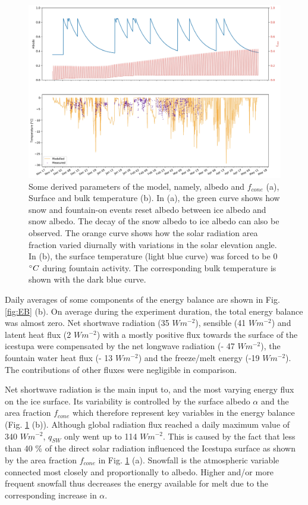 \documentclass[utf8]{frontiersSCNS} %
\begin{document}
\begin{figure} 
    \centering
    \includegraphics[width=15 cm]{Figures/albedo_temperature.jpg} 
\caption{Some derived parameters of the model, namely, albedo and $f_{cone}$ (a), Surface and bulk temperature (b). In
    (a), the green curve shows how snow and fountain-on events reset albedo between ice albedo and snow albedo.  The
    decay of the snow albedo to ice albedo can also be observed. The orange curve shows how the solar radiation area
    fraction varied diurnally with variations in the solar elevation angle. In (b), the surface temperature (light blue
    curve) was forced to be 0 $\degree C$ during fountain activity. The corresponding bulk temperature is shown with the
    dark blue curve.} 
\label{fig:derived} 
\end{figure}
  

Daily averages of some components of the energy balance are shown in Fig.  \ref{fig:EB} (b). On average during the
experiment duration, the total energy balance was almost zero. Net shortwave radiation (35 $Wm^{-2}$), sensible (41
$Wm^{-2}$) and latent heat flux (2 $Wm^{-2}$) with a mostly positive flux towards the surface of the icestupa were
compensated by the net longwave radiation (- 47 $Wm^{-2}$), the fountain water heat flux (- 13 $Wm^{-2}$) and the
freeze/melt energy (-19 $Wm^{-2}$). The contributions of other fluxes were negligible in comparison.

Net shortwave radiation is the main input to, and the most varying energy flux on the ice surface. Its variability is
controlled by the surface albedo $\alpha$ and the area fraction $f_{cone}$ which therefore represent key variables in
the energy balance (Fig. \ref{fig:derived} (b)). Although global radiation flux reached a daily maximum value of 340
$Wm^{-2}$, $q_{SW}$ only went up to 114 $Wm^{-2}$. This is caused by the fact that less than 40 \% of the direct solar
radiation influenced the Icestupa surface as shown by the area fraction $f_{cone}$ in Fig. \ref{fig:derived} (a).
Snowfall is the atmospheric variable connected most closely and proportionally to albedo.  Higher and/or more frequent
snowfall thus decreases the energy available for melt due to the corresponding increase in $\alpha$. 
\end{document}
